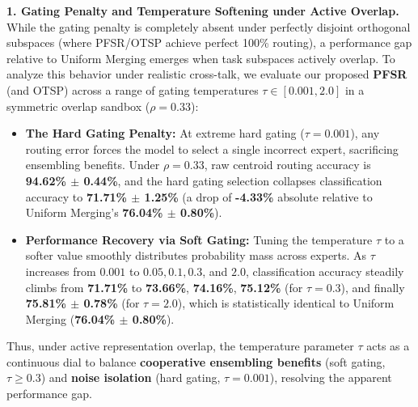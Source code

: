 \textbf{1. Gating Penalty and Temperature Softening under Active Overlap.}
While the gating penalty is completely absent under perfectly disjoint orthogonal subspaces (where PFSR/OTSP achieve perfect 100\% routing), a performance gap relative to Uniform Merging emerges when task subspaces actively overlap. To analyze this behavior under realistic cross-talk, we evaluate our proposed \textbf{PFSR} (and OTSP) across a range of gating temperatures $\tau \in [0.001, 2.0]$ in a symmetric overlap sandbox ($\rho = 0.33$):
\begin{itemize}
    \item \textbf{The Hard Gating Penalty:} At extreme hard gating ($\tau = 0.001$), any routing error forces the model to select a single incorrect expert, sacrificing ensembling benefits. Under $\rho = 0.33$, raw centroid routing accuracy is \textbf{94.62\% $\pm$ 0.44\%}, and the hard gating selection collapses classification accuracy to \textbf{71.71\% $\pm$ 1.25\%} (a drop of \textbf{-4.33\%} absolute relative to Uniform Merging's \textbf{76.04\% $\pm$ 0.80\%}).
    \item \textbf{Performance Recovery via Soft Gating:} Tuning the temperature $\tau$ to a softer value smoothly distributes probability mass across experts. As $\tau$ increases from $0.001$ to $0.05, 0.1, 0.3$, and $2.0$, classification accuracy steadily climbs from \textbf{71.71\%} to \textbf{73.66\%}, \textbf{74.16\%}, \textbf{75.12\%} (for $\tau = 0.3$), and finally \textbf{75.81\% $\pm$ 0.78\%} (for $\tau = 2.0$), which is statistically identical to Uniform Merging (\textbf{76.04\% $\pm$ 0.80\%}).
\end{itemize}
Thus, under active representation overlap, the temperature parameter $\tau$ acts as a continuous dial to balance \textbf{cooperative ensembling benefits} (soft gating, $\tau \ge 0.3$) and \textbf{noise isolation} (hard gating, $\tau = 0.001$), resolving the apparent performance gap.

